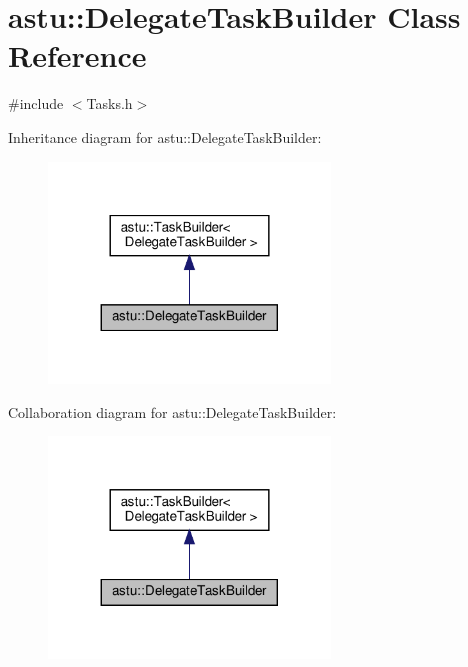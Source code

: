 \hypertarget{classastu_1_1DelegateTaskBuilder}{}\section{astu\+:\+:Delegate\+Task\+Builder Class Reference}
\label{classastu_1_1DelegateTaskBuilder}


{\ttfamily \#include $<$Tasks.\+h$>$}



Inheritance diagram for astu\+:\+:Delegate\+Task\+Builder\+:\nopagebreak
\begin{figure}[H]
\begin{center}
\leavevmode
\includegraphics[width=212pt]{classastu_1_1DelegateTaskBuilder__inherit__graph}
\end{center}
\end{figure}


Collaboration diagram for astu\+:\+:Delegate\+Task\+Builder\+:\nopagebreak
\begin{figure}[H]
\begin{center}
\leavevmode
\includegraphics[width=212pt]{classastu_1_1DelegateTaskBuilder__coll__graph}
\end{center}
\end{figure}

